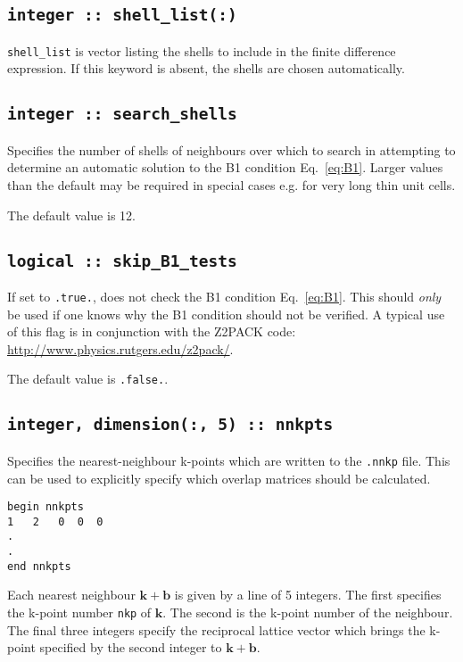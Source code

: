 \subsection[shell\_list]{\tt integer :: shell\_list(:)}

\verb#shell_list# is vector listing the shells
to include in the finite difference expression. If this keyword is
absent, the shells are chosen automatically.

\subsection[search\_shells]{\tt integer :: search\_shells}

Specifies the number of shells of neighbours over which to search in
attempting to determine an automatic solution to the B1 condition
Eq.~\ref{eq:B1}. Larger values than the default may be required in special
cases e.g. for very long thin unit cells. 

The default value is 12.

\subsection[skip\_B1\_tests]{\tt logical :: skip\_B1\_tests}

If set to \texttt{.true.}, does not check the B1 condition
Eq.~\ref{eq:B1}. This should \emph{only} be used if one knows
why the B1 condition should not be verified. A typical use of this
flag is in conjunction with the Z2PACK code:
\url{http://www.physics.rutgers.edu/z2pack/}.

The default value is \texttt{.false.}.

\subsection[nnkpts]{\tt integer, dimension(:, 5) :: nnkpts}

Specifies the nearest-neighbour k-points which are written to the \texttt{.nnkp} file. This can be used to explicitly specify which overlap matrices should be calculated.

\begin{verbatim}
begin nnkpts
1   2   0  0  0
.
.
end nnkpts
\end{verbatim}

Each nearest neighbour $\mathbf{k + b}$ is given by a line of 5 integers. The first specifies the k-point number \texttt{nkp} of $\mathbf{k}$. The second is the k-point number of the neighbour. The final three integers specify the reciprocal lattice vector which brings the k-point specified by the second integer to $\mathbf{k + b}$.

